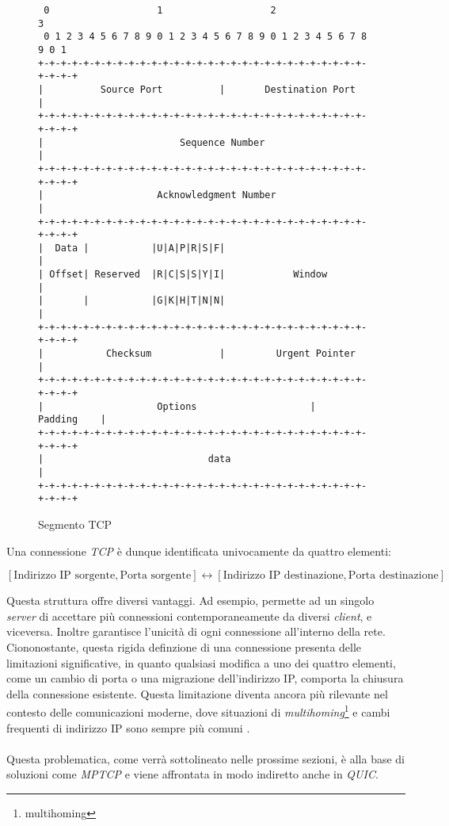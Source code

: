 \begin{figure}[!h]
\centering
\begin{BVerbatim}
 0                   1                   2                   3   
 0 1 2 3 4 5 6 7 8 9 0 1 2 3 4 5 6 7 8 9 0 1 2 3 4 5 6 7 8 9 0 1 
+-+-+-+-+-+-+-+-+-+-+-+-+-+-+-+-+-+-+-+-+-+-+-+-+-+-+-+-+-+-+-+-+
|          Source Port          |       Destination Port        |
+-+-+-+-+-+-+-+-+-+-+-+-+-+-+-+-+-+-+-+-+-+-+-+-+-+-+-+-+-+-+-+-+
|                        Sequence Number                        |
+-+-+-+-+-+-+-+-+-+-+-+-+-+-+-+-+-+-+-+-+-+-+-+-+-+-+-+-+-+-+-+-+
|                    Acknowledgment Number                      |
+-+-+-+-+-+-+-+-+-+-+-+-+-+-+-+-+-+-+-+-+-+-+-+-+-+-+-+-+-+-+-+-+
|  Data |           |U|A|P|R|S|F|                               |
| Offset| Reserved  |R|C|S|S|Y|I|            Window             |
|       |           |G|K|H|T|N|N|                               |
+-+-+-+-+-+-+-+-+-+-+-+-+-+-+-+-+-+-+-+-+-+-+-+-+-+-+-+-+-+-+-+-+
|           Checksum            |         Urgent Pointer        |
+-+-+-+-+-+-+-+-+-+-+-+-+-+-+-+-+-+-+-+-+-+-+-+-+-+-+-+-+-+-+-+-+
|                    Options                    |    Padding    |
+-+-+-+-+-+-+-+-+-+-+-+-+-+-+-+-+-+-+-+-+-+-+-+-+-+-+-+-+-+-+-+-+
|                             data                              |
+-+-+-+-+-+-+-+-+-+-+-+-+-+-+-+-+-+-+-+-+-+-+-+-+-+-+-+-+-+-+-+-+
           \end{BVerbatim}
\caption{Segmento TCP}
\label{fig}
\end{figure}

\noindent Una connessione \emph{TCP} è dunque identificata univocamente da quattro elementi:

\begin{center}
    \small
    $[\text{Indirizzo IP sorgente}, \text{Porta sorgente}] \leftrightarrow [\text{Indirizzo IP destinazione}, \text{Porta destinazione}]$
\end{center}

\noindent Questa struttura offre diversi vantaggi. Ad esempio, permette ad un singolo \emph{server} di accettare più connessioni contemporaneamente da diversi \emph{client}, e viceversa. 
Inoltre garantisce l'unicità di ogni connessione all'interno della rete.
\\
Ciononostante, questa rigida definzione di una connessione presenta delle limitazioni significative, in quanto qualsiasi modifica a uno dei quattro elementi, come un cambio di porta o una migrazione dell'indirizzo IP, comporta la chiusura della connessione esistente.
Questa limitazione diventa ancora più rilevante nel contesto delle comunicazioni moderne, dove situazioni di \emph{multihoming}\footnote{\gls{multihoming}} e cambi frequenti di indirizzo IP sono sempre più comuni \cite{site:tcp}. 
\\
\\
Questa problematica, come verrà sottolineato nelle prossime sezioni, è alla base di soluzioni come \emph{MPTCP} e viene affrontata in modo indiretto anche in \emph{QUIC}.

